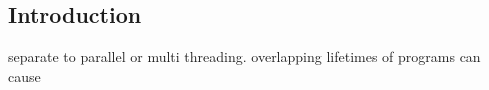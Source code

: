 
\subsection{Introduction}

separate to parallel or multi threading. overlapping lifetimes of programs can cause
